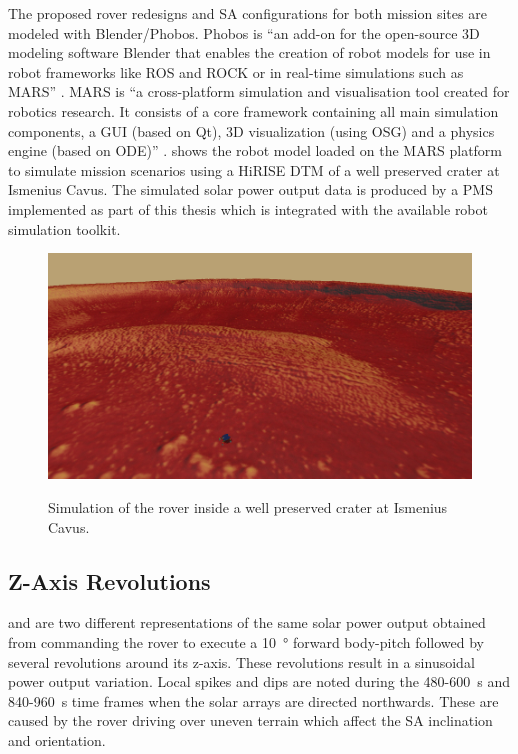 The proposed rover redesigns and \ac{SA} configurations for both mission sites are modeled with Blender/Phobos. Phobos is ``an add-on for the open-source 3D modeling software Blender that enables the creation of robot models for use in robot frameworks like ROS and ROCK or in real-time simulations such as MARS'' . MARS is ``a cross-platform simulation and visualisation tool created for robotics research. It consists of a core framework containing all main simulation components, a GUI (based on Qt), 3D visualization (using OSG) and a physics engine (based on ODE)'' .  shows the robot model loaded on the MARS platform to simulate mission scenarios using a \ac{HiRISE} \ac{DTM} of a well preserved crater at Ismenius Cavus. The simulated solar power output data is produced by a \ac{PMS} implemented as part of this thesis which is integrated with the available robot simulation toolkit.

\begin{figure}[h]
  \captionsetup[subfigure]{justification=centering}
  \centering
  \hypersetup{linkcolor=captionTextColor}
  \includegraphics[width=0.70\linewidth]{sections/design/simulation/images/mars-sim-ismenius-cavus.png}\\
  \caption[Simulation of the rover inside a well preserved crater at Ismenius Cavus]
          {Simulation of the rover inside a well preserved crater at Ismenius Cavus.}
  \label{fig:simulated-mission-site-ismenius-cavus}
\end{figure}

\subsection{Z-Axis Revolutions}

 and  are two different representations of the same solar power output obtained from commanding the rover to execute a \SI{10}{\degree} forward body-pitch followed by several revolutions around its z-axis. These revolutions result in a sinusoidal power output variation. Local spikes and dips are noted during the 480-\SI{600}{\second} and 840-\SI{960}{\second} time frames when the solar arrays are directed northwards. These are caused by the rover driving over uneven terrain which affect the \ac{SA} inclination and orientation.


